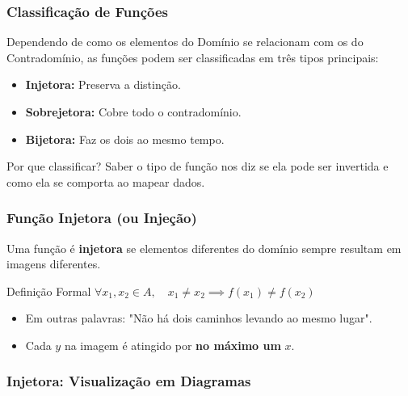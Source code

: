 \documentclass[9pt]{beamer}
\begin{document}
\begin{frame}
\frametitle{Classificação de Funções}
Dependendo de como os elementos do Domínio se relacionam com os do Contradomínio, as funções podem ser classificadas em três tipos principais:

\begin{itemize}
    \item \textbf{Injetora:} Preserva a distinção.
    \item \textbf{Sobrejetora:} Cobre todo o contradomínio.
    \item \textbf{Bijetora:} Faz os dois ao mesmo tempo.
\end{itemize}

\begin{block}{Por que classificar?}
Saber o tipo de função nos diz se ela pode ser invertida e como ela se comporta ao mapear dados.
\end{block}
\end{frame}

\begin{frame}
\frametitle{Função Injetora (ou Injeção)}
Uma função é \textbf{injetora} se elementos diferentes do domínio sempre resultam em imagens diferentes.

\begin{block}{Definição Formal}
$\forall x_1, x_2 \in A, \quad x_1 \neq x_2 \implies f(x_1) \neq f(x_2)$
\end{block}

\begin{itemize}
    \item Em outras palavras: "Não há dois caminhos levando ao mesmo lugar".
    \item Cada $y$ na imagem é atingido por \textbf{no máximo um} $x$.
\end{itemize}
\end{frame}

\begin{frame}
\frametitle{Injetora: Visualização em Diagramas}
\centering
{}
\end{frame}
\end{document}
